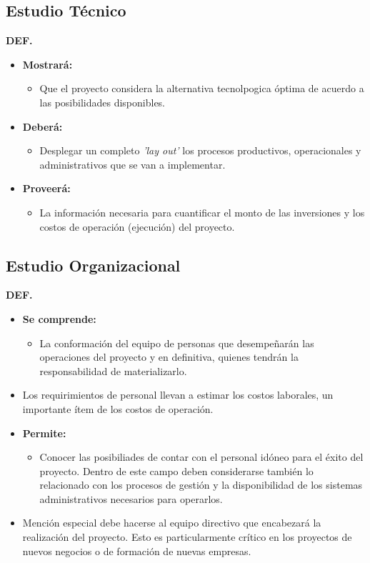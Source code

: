 \documentclass{templateNote}
\begin{document}
\subsection{Estudio Técnico}\hypertarget{ET}{}
\textbf{DEF.}
\begin{itemize}
  \item \textbf{Mostrará:}
  \begin{itemize}
    \item Que el proyecto considera la alternativa tecnolpogica óptima de acuerdo a las posibilidades disponibles.
  \end{itemize}
  \item \textbf{Deberá:}
  \begin{itemize}
    \item Desplegar un completo \textit{'lay out'} los procesos productivos, operacionales y administrativos que se van a implementar.
  \end{itemize}
  \item \textbf{Proveerá:}
  \begin{itemize}
    \item La información necesaria para cuantificar el monto de las inversiones y los costos de operación (ejecución) del proyecto.
  \end{itemize}
\end{itemize}

\newpage
\subsection{Estudio Organizacional}\hypertarget{EO}{}
\textbf{DEF.}
\begin{itemize}
  \item \textbf{Se comprende:}
  \begin{itemize}
    \item La conformación del equipo de personas que desempeñarán las operaciones del proyecto y en definitiva, quienes tendrán la responsabilidad de materializarlo.
  \end{itemize}
  \item Los requirimientos de personal llevan a estimar los costos laborales, un importante ítem de los costos de operación.
  \item \textbf{Permite:}
  \begin{itemize}
    \item Conocer las posibiliades de contar con el personal idóneo para el éxito del proyecto. Dentro de este campo deben considerarse también lo relacionado con los procesos de gestión y la disponibilidad de los sistemas administrativos necesarios para operarlos.
  \end{itemize}
  \item Mención especial debe hacerse al equipo directivo que encabezará la realización del proyecto. Esto es particularmente crítico en los proyectos de nuevos negocios o de formación de nuevas empresas.
\end{itemize}
\end{document}
